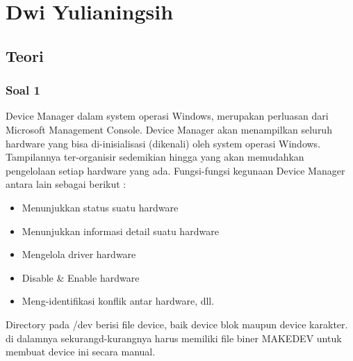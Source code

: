 \section{Dwi Yulianingsih}
\subsection{Teori}
\subsubsection{Soal 1}
Device Manager dalam system operasi Windows, merupakan perluasan dari Microsoft Management Console. Device Manager akan menampilkan seluruh hardware yang bisa di-inisialisasi (dikenali) oleh system operasi Windows. Tampilannya ter-organisir sedemikian hingga yang akan memudahkan pengelolaan setiap hardware yang ada.
Fungsi-fungsi kegunaan Device Manager antara lain sebagai berikut :
\begin{itemize}
\item Menunjukkan status suatu hardware
\item Menunjukkan informasi detail suatu hardware
\item Mengelola driver hardware
\item Disable \& Enable hardware
\item Meng-identifikasi konflik antar hardware, dll.
\end{itemize}
Directory pada /dev berisi file device, baik device blok maupun device karakter. di dalamnya sekurangd-kurangnya  harus memiliki file biner MAKEDEV untuk membuat device ini secara manual.

